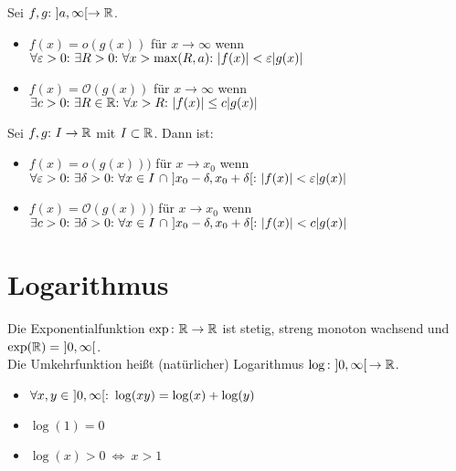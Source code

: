 \begin{frameddefn}
	Sei $f,g {:}\  ]a,\infty[ \to \mathbb{R}$.
	\begin{itemize}
		\item $f(x) = \textit{o}(g(x))$ für $x \to \infty$ wenn\\ $\forall \varepsilon > 0 {:}\  \exists R > 0{:}\  \forall x > \max(R,a){:}\  |f(x)| < \varepsilon |g(x)|$
		\item $f(x) = \mathcal{O}(g(x))$ für $x \to \infty$ wenn\\ $\exists c > 0 {:}\  \exists R \in \mathbb{R} {:}\  \forall x > R{:}\  |f(x)| \leq c |g(x)|$
	\end{itemize}
	Sei $f,g {:}\  I \to \mathbb{R}$ mit $I \subset \mathbb{R}$. Dann ist:
	\begin{itemize}
		\item $f(x) = \textit{o}(g(x)))$ für $x \to x_0$ wenn \\
		$\forall \varepsilon > 0 {:}\  \exists \delta > 0 {:}\  \forall x \in I \ \cap\  ]x_0 - \delta, x_0 + \delta[{:}\  |f(x)| < \varepsilon |g(x)|$
		\item $f(x) = \mathcal{O}(g(x)))$ für $x \to x_0$ wenn \\
		$\exists c > 0 {:}\  \exists \delta > 0 {:}\  \forall x \in I \ \cap\  ]x_0 - \delta, x_0 + \delta[{:}\  |f(x)| < c |g(x)|$
	\end{itemize}
\end{frameddefn}

\section{Logarithmus}

\begin{framedthm}
	Die Exponentialfunktion $\exp {:}\  \mathbb{R} \to \mathbb{R}$ ist stetig, streng monoton wachsend und\\ $\exp(\mathbb{R}) =\  ]0,\infty[$.\\Die Umkehrfunktion heißt (natürlicher) Logarithmus $\log{:}\  ]0,\infty[\, \to \mathbb{R}$.
\end{framedthm}

\begin{framedthm}
	\begin{itemize}
		\item $\forall x,y \in\  ]0,\infty[{:}\  \log(xy) = \log(x) + \log(y)$
		\item $\log(1) = 0$
		\item $\log(x) > 0 \ \iff\ x > 1$
	\end{itemize}
\end{framedthm}

